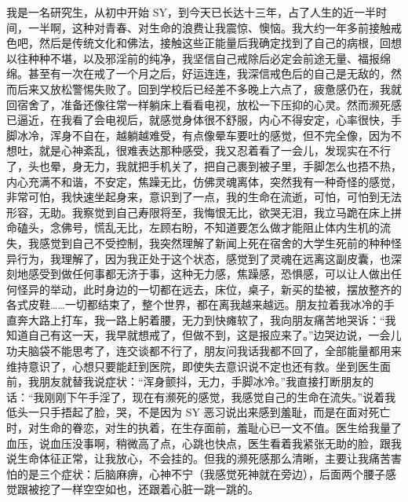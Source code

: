 \begin{case}
    我是一名研究生，从初中开始 SY，到今天已长达十三年，占了人生的近一半时间，一半啊，这种对青春、对生命的浪费让我震惊、懊恼。我大约一年多前接触戒色吧，然后是传统文化和佛法，接触这些正能量后我确定找到了自己的病根，回想以往种种不堪，以及邪淫前的纯净，我坚信自己戒除后必定会前途无量、福报绵绵。甚至有一次在戒了一个月之后，好运连连，我深信戒色后的自己是无敌的，然而后来又放松警惕失败了。回到学校后已经差不多晚上六点了，疲惫感仍在，我就回宿舍了，准备还像往常一样躺床上看看电视，放松一下压抑的心灵。然而濒死感已逼近，在我看了会电视后，就感觉身体很不舒服，内心不得安定，心率很快，手脚冰冷，浑身不自在，越躺越难受，有点像晕车要吐的感觉，但不完全像，因为不想吐，就是心神紊乱，很难表达那种感受，我又忍着看了一会儿，发现实在不行了，头也晕，身无力，我就把手机关了，把自己裹到被子里，手脚怎么也捂不热，内心充满不和谐，不安定，焦躁无比，仿佛灵魂离体，突然我有一种奇怪的感觉，非常可怕，我快速坐起身来，意识到了一点，我的生命在流逝，可怕，可怕到无法形容，无助。我察觉到自己寿限将至，我悔恨无比，欲哭无泪，我立马跪在床上拼命磕头，念佛号，慌乱无比，左顾右盼，不知道要怎么做才能阻止体内生机的流失，我感觉到自己不受控制，我突然理解了新闻上死在宿舍的大学生死前的种种怪异行为，我理解了，因为我正处于这个状态，感觉到了灵魂在远离这副皮囊，也深刻地感受到做任何事都无济于事，这种无力感，焦躁感，恐惧感，可以让人做出任何怪异的举动，此时身边的一切都在远去，床位，桌子，新买的垫被，摆放整齐的各式皮鞋……一切都结束了，整个世界，都在离我越来越远。朋友拉着我冰冷的手直奔大路上打车，我一路上躬着腰，无力到快瘫软了，我向朋友痛苦地哭诉：“我知道自己有这一天，我早就想戒了，但做不到，这是报应来了。”边哭边说，一会儿功夫脑袋不能思考了，连交谈都不行了，朋友问我话我都不回了，全部能量都用来维持意识了，心想只要能赶到医院，即使失去意识说不定也还有救。坐到医生面前，我朋友就替我说症状：“浑身颤抖，无力，手脚冰冷。”我直接打断朋友的话：“我刚刚下午手淫了，现在有濒死的感觉，我感觉自己的生命在流失。”说着我低头一只手捂起了脸，哭，不是因为 SY 恶习说出来感到羞耻，而是在面对死亡时，对生命的眷恋，对生的执着，在生存面前，羞耻心已一文不值。医生给我量了血压，说血压没事啊，稍微高了点，心跳也快点，医生看着我紧张无助的脸，跟我说生命体征正常，让我放心，不会挂的。但我的濒死感那么清晰，主要让我痛苦害怕的是三个症状：后脑麻痹，心神不宁（我感觉死神就在旁边），后面两个腰子感觉跟被挖了一样空空如也，还跟着心脏一跳一跳的。


\end{case}
